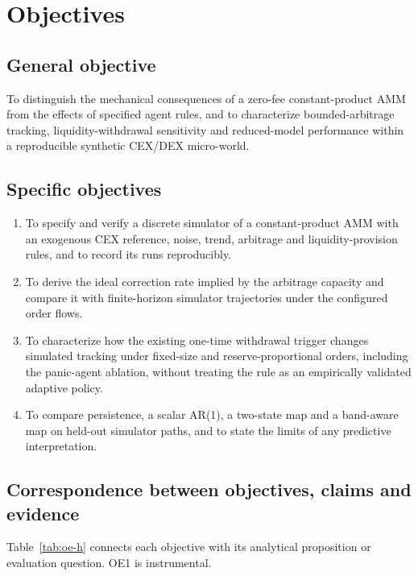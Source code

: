 \chapter{Objectives}
\label{cap:objetivos}

\section{General objective}

To distinguish the mechanical consequences of a zero-fee constant-product AMM from the effects of specified agent rules, and to characterize bounded-arbitrage tracking, liquidity-withdrawal sensitivity and reduced-model performance within a reproducible synthetic CEX/DEX micro-world.

\section{Specific objectives}

\begin{enumerate}[label=\textbf{OE\arabic*.}, leftmargin=3em]
  \item To specify and verify a discrete simulator of a constant-product AMM with an exogenous CEX reference, noise, trend, arbitrage and liquidity-provision rules, and to record its runs reproducibly.
  \item To derive the ideal correction rate implied by the arbitrage capacity and compare it with finite-horizon simulator trajectories under the configured order flows.
  \item To characterize how the existing one-time withdrawal trigger changes simulated tracking under fixed-size and reserve-proportional orders, including the panic-agent ablation, without treating the rule as an empirically validated adaptive policy.
  \item To compare persistence, a scalar AR(1), a two-state map and a band-aware map on held-out simulator paths, and to state the limits of any predictive interpretation.
\end{enumerate}

\section{Correspondence between objectives, claims and evidence}

Table~\ref{tab:oe-h} connects each objective with its analytical proposition or evaluation question. OE1 is instrumental.

